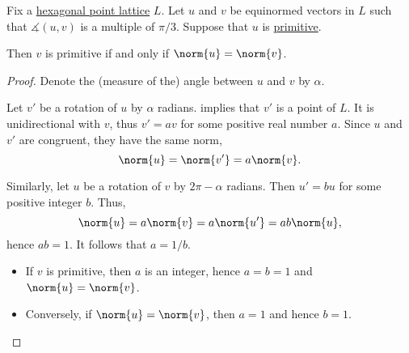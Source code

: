 \begin{lemma}\label{thm:primitive_hexagonal_lattice_vector_norm}
  Fix a \hyperref[def:hexagonal_point_lattice]{hexagonal point lattice} \( L \). Let \( u \) and \( v \) be equinormed vectors in \( L \) such that \( \measuredangle(u, v) \) is a multiple of \( \pi / 3 \). Suppose that \( u \) is \hyperref[def:primitive_lattice_vector]{primitive}.

  Then \( v \) is primitive if and only if \( \norm{u} = \norm{v} \).
\end{lemma}
\begin{proof}
  Denote the (measure of the) angle between \( u \) and \( v \) by \( \alpha \).

  Let \( v' \) be a rotation of \( u \) by \( \alpha \) radians.  implies that \( v' \) is a point of \( L \). It is unidirectional with \( v \), thus \( v' = a v \) for some positive real number \( a \). Since \( u \) and \( v' \) are congruent, they have the same norm,
  \begin{equation*}
    \norm{u} = \norm{v'} = a \norm{v}.
  \end{equation*}

  Similarly, let \( u \) be a rotation of \( v \) by \( 2\pi - \alpha \) radians. Then \( u' = b u \) for some positive integer \( b \). Thus,
  \begin{equation*}
    \norm{u} = a \norm{v} = a \norm{u'} = a b \norm{u},
  \end{equation*}
  hence \( ab = 1 \). It follows that \( a = 1 / b \).

  \begin{itemize}
    \item If \( v \) is primitive, then \( a \) is an integer, hence \( a = b = 1 \) and \( \norm{u} = \norm{v} \).
    \item Conversely, if \( \norm{u} = \norm{v} \), then \( a = 1 \) and hence \( b = 1 \).
  \end{itemize}
\end{proof}

